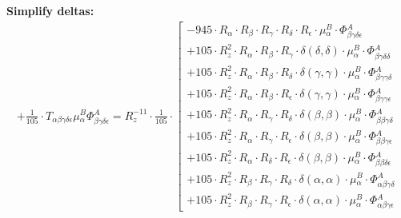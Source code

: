 \documentclass{article}
\begin{document}
\textbf{Simplify deltas:}
\begin{subequations}\begin{gather}
+ \frac{1}{105} \cdot T_{\alpha{}\beta{}\gamma{}\delta{}\epsilon{}} \mu{}^{B}_{\alpha{}} \Phi{}^{A}_{\beta{}\gamma{}\delta{}\epsilon{}} = R_{z}^{-11} \cdot \frac{1}{105} \cdot  \left[ \begin{array}{c} 
 		- 945 \cdot R_{\alpha{}} \cdot R_{\beta{}} \cdot R_{\gamma{}} \cdot R_{\delta{}} \cdot R_{\epsilon{}} \cdot \mu{}^{B}_{\alpha{}} \cdot \Phi{}^{A}_{\beta{}\gamma{}\delta{}\epsilon{}} 
 \\[0.2em] 		 + 105 \cdot R_{z}^{2} \cdot R_{\alpha{}} \cdot R_{\beta{}} \cdot R_{\gamma{}} \cdot \delta{}\left(\delta{}, \delta{}\right) \cdot \mu{}^{B}_{\alpha{}} \cdot \Phi{}^{A}_{\beta{}\gamma{}\delta{}\delta{}} 
 \\[0.2em] 		 + 105 \cdot R_{z}^{2} \cdot R_{\alpha{}} \cdot R_{\beta{}} \cdot R_{\delta{}} \cdot \delta{}\left(\gamma{}, \gamma{}\right) \cdot \mu{}^{B}_{\alpha{}} \cdot \Phi{}^{A}_{\beta{}\gamma{}\gamma{}\delta{}} 
 \\[0.2em] 		 + 105 \cdot R_{z}^{2} \cdot R_{\alpha{}} \cdot R_{\beta{}} \cdot R_{\epsilon{}} \cdot \delta{}\left(\gamma{}, \gamma{}\right) \cdot \mu{}^{B}_{\alpha{}} \cdot \Phi{}^{A}_{\beta{}\gamma{}\gamma{}\epsilon{}} 
 \\[0.2em] 		 + 105 \cdot R_{z}^{2} \cdot R_{\alpha{}} \cdot R_{\gamma{}} \cdot R_{\delta{}} \cdot \delta{}\left(\beta{}, \beta{}\right) \cdot \mu{}^{B}_{\alpha{}} \cdot \Phi{}^{A}_{\beta{}\beta{}\gamma{}\delta{}} 
 \\[0.2em] 		 + 105 \cdot R_{z}^{2} \cdot R_{\alpha{}} \cdot R_{\gamma{}} \cdot R_{\epsilon{}} \cdot \delta{}\left(\beta{}, \beta{}\right) \cdot \mu{}^{B}_{\alpha{}} \cdot \Phi{}^{A}_{\beta{}\beta{}\gamma{}\epsilon{}} 
 \\[0.2em] 		 + 105 \cdot R_{z}^{2} \cdot R_{\alpha{}} \cdot R_{\delta{}} \cdot R_{\epsilon{}} \cdot \delta{}\left(\beta{}, \beta{}\right) \cdot \mu{}^{B}_{\alpha{}} \cdot \Phi{}^{A}_{\beta{}\beta{}\delta{}\epsilon{}} 
 \\[0.2em] 		 + 105 \cdot R_{z}^{2} \cdot R_{\beta{}} \cdot R_{\gamma{}} \cdot R_{\delta{}} \cdot \delta{}\left(\alpha{}, \alpha{}\right) \cdot \mu{}^{B}_{\alpha{}} \cdot \Phi{}^{A}_{\alpha{}\beta{}\gamma{}\delta{}} 
 \\[0.2em] 		 + 105 \cdot R_{z}^{2} \cdot R_{\beta{}} \cdot R_{\gamma{}} \cdot R_{\epsilon{}} \cdot \delta{}\left(\alpha{}, \alpha{}\right) \cdot \mu{}^{B}_{\alpha{}} \cdot \Phi{}^{A}_{\alpha{}\beta{}\gamma{}\epsilon{}} 

\end{array}
\end{gather}
\end{subequations}
\end{document}
